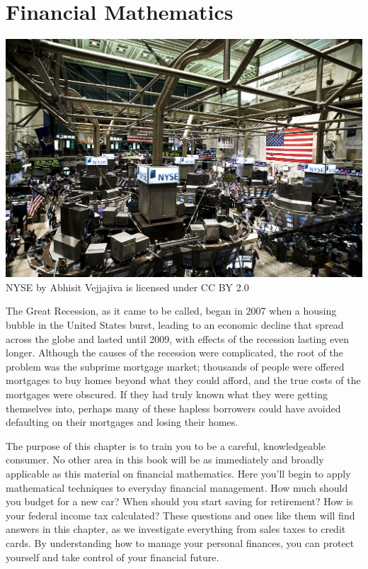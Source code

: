 \documentclass[9pt,letter,twoside,openright]{memoir}
\begin{document}
\frontmatter
{}
\pagestyle{empty}
\titleBC
\frontmatter


\vfill
\pagebreak

\setcounter{tocdepth}{1}
\tableofcontents*
\mainmatter
\restoregeometry
\pagestyle{doc}

\chapter{Financial Mathematics}
\begin{center}
\includegraphics[width=\textwidth]{NYSE2}\\
\text{} \hfill {\color{gray} NYSE by Abhisit Vejjajiva is licensed under CC BY 2.0}
\end{center}
\vfill

The Great Recession, as it came to be called, began in 2007 when a housing bubble in the United States burst, leading to an economic decline that spread across the globe and lasted until 2009, with effects of the recession lasting even longer.  Although the causes of the recession were complicated, the root of the problem was the subprime mortgage market; thousands of people were offered mortgages to buy homes beyond what they could afford, and the true costs of the mortgages were obscured.  If they had truly known what they were getting themselves into, perhaps many of these hapless borrowers could have avoided defaulting on their mortgages and losing their homes.

The purpose of this chapter is to train you to be a careful, knowledgeable consumer.  No other area in this book will be as immediately and broadly applicable as this material on financial mathematics.  Here you'll begin to apply mathematical techniques to everyday financial management.  How much should you budget for a new car?  When should you start saving for retirement?  How is your federal income tax calculated?  These questions and ones like them will find answers in this chapter, as we investigate everything from sales taxes to credit cards.  By understanding how to manage your personal finances, you can protect yourself and take control of your financial future.
\vfill
\pagebreak
\end{document}
